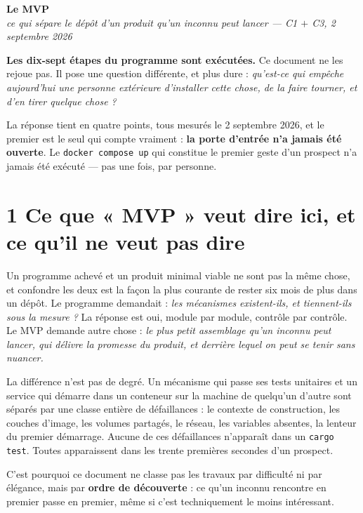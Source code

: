 \documentclass[11pt]{article}
\newcommand{\code}[1]{\texttt{\small #1}}
\begin{document}
\begin{center}
{\Huge\bfseries\color{efenavy} Le MVP}\\[3pt]
{\large\color{efegray}\itshape ce qui sépare le dépôt d'un produit qu'un inconnu peut lancer
--- C1 $+$ C3, 2 septembre 2026}
\end{center}

\vspace{2pt}

\begin{these}
\textbf{Les dix-sept étapes du programme sont exécutées.} Ce document ne les rejoue pas. Il pose une
question différente, et plus dure : \emph{qu'est-ce qui empêche aujourd'hui une personne extérieure
d'installer cette chose, de la faire tourner, et d'en tirer quelque chose ?}

La réponse tient en quatre points, tous mesurés le 2 septembre 2026, et le premier est le seul qui
compte vraiment : \textbf{la porte d'entrée n'a jamais été ouverte}. Le \code{docker compose up} qui
constitue le premier geste d'un prospect n'a jamais été exécuté --- pas une fois, par personne.
\end{these}

\section{1 \;\textbar\; Ce que « MVP » veut dire ici, et ce qu'il ne veut pas dire}

Un programme achevé et un produit minimal viable ne sont pas la même chose, et confondre les deux est
la façon la plus courante de rester six mois de plus dans un dépôt. Le programme demandait : \emph{les
mécanismes existent-ils, et tiennent-ils sous la mesure ?} La réponse est oui, module par module,
contrôle par contrôle. Le MVP demande autre chose : \emph{le plus petit assemblage qu'un inconnu peut
lancer, qui délivre la promesse du produit, et derrière lequel on peut se tenir sans nuancer.}

La différence n'est pas de degré. Un mécanisme qui passe ses tests unitaires et un service qui démarre
dans un conteneur sur la machine de quelqu'un d'autre sont séparés par une classe entière de
défaillances : le contexte de construction, les couches d'image, les volumes partagés, le réseau, les
variables absentes, la lenteur du premier démarrage. Aucune de ces défaillances n'apparaît dans un
\code{cargo test}. Toutes apparaissent dans les trente premières secondes d'un prospect.

C'est pourquoi ce document ne classe pas les travaux par difficulté ni par élégance, mais par
\textbf{ordre de découverte} : ce qu'un inconnu rencontre en premier passe en premier, même si c'est
techniquement le moins intéressant.
\end{document}
